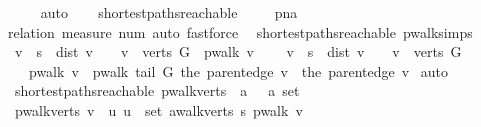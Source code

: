 \begin{isabellebody}
\ \ \ \ {\isacharparenright}{\isachardoublequoteclose}\isanewline
%
\isadelimproof
%
\endisadelimproof
%
\isatagproof
{}\isamarkupfalse%
\ auto%
\endisatagproof
{\isafoldproof}%
%
\isadelimproof
\ \isanewline
%
\endisadelimproof
{}\isamarkupfalse%
\ {\isacharparenleft}\ shortest{\isacharunderscore}paths{\isacharunderscore}reachable{\isacharparenright}\ \isanewline
%
\isadelimproof
\ \ %
\endisadelimproof
%
\isatagproof
{}\isamarkupfalse%
\ pna\isanewline
\ \ \isamarkupfalse%
\ {\isacharparenleft}relation\ {\isachardoublequoteopen}measure\ num{\isachardoublequoteclose}{\isacharcomma}\ auto{\isacharcomma}\ fastforce{\isacharparenright}%
\endisatagproof
{\isafoldproof}%
%
\isadelimproof
\isanewline
%
\endisadelimproof
\isanewline
\isanewline
{}\isamarkupfalse%
\ {\isacharparenleft}\ shortest{\isacharunderscore}paths{\isacharunderscore}reachable{\isacharparenright}\ pwalk{\isacharunderscore}simps{\isacharcolon}\isanewline
\ \ {\isachardoublequoteopen}v\ {\isacharequal}\ s\ {\isasymor}\ dist\ v\ {\isacharequal}\ {\isasyminfinity}\ {\isasymor}\ v\ {\isasymnotin}\ verts\ G\ {\isasymLongrightarrow}\ pwalk\ v\ {\isacharequal}\ {\isacharbrackleft}{\isacharbrackright}{\isachardoublequoteclose}\isanewline
\ \ {\isachardoublequoteopen}v\ {\isasymnoteq}\ s\ {\isasymLongrightarrow}\ dist\ v\ {\isasymnoteq}\ {\isasyminfinity}\ {\isasymLongrightarrow}\ v\ {\isasymin}\ verts\ G\ {\isasymLongrightarrow}\ \isanewline
\ \ \ \ pwalk\ v\ {\isacharequal}\ pwalk\ {\isacharparenleft}tail\ G\ {\isacharparenleft}the\ {\isacharparenleft}parent{\isacharunderscore}edge\ v{\isacharparenright}{\isacharparenright}{\isacharparenright}\ {\isacharat}\ {\isacharbrackleft}the\ {\isacharparenleft}parent{\isacharunderscore}edge\ v{\isacharparenright}{\isacharbrackright}{\isachardoublequoteclose}\isanewline
%
\isadelimproof
%
\endisadelimproof
%
\isatagproof
{}\isamarkupfalse%
\ auto%
\endisatagproof
{\isafoldproof}%
%
\isadelimproof
\isanewline
%
\endisadelimproof
\isanewline
{}\isamarkupfalse%
\ {\isacharparenleft}\ shortest{\isacharunderscore}paths{\isacharunderscore}reachable{\isacharparenright}\ pwalk{\isacharunderscore}verts\ {\isacharcolon}{\isacharcolon}\ {\isachardoublequoteopen}{\isacharprime}a\ \ {\isasymRightarrow}\ {\isacharprime}a\ set{\isachardoublequoteclose}\ \ \isanewline
\ \ {\isachardoublequoteopen}pwalk{\isacharunderscore}verts\ v\ {\isacharequal}\ {\isacharbraceleft}u{\isachardot}\ u\ {\isasymin}\ set\ {\isacharparenleft}awalk{\isacharunderscore}verts\ s\ {\isacharparenleft}pwalk\ v{\isacharparenright}{\isacharparenright}{\isacharbraceright}{\isachardoublequoteclose}\ \isanewline

\end{isabellebody}
